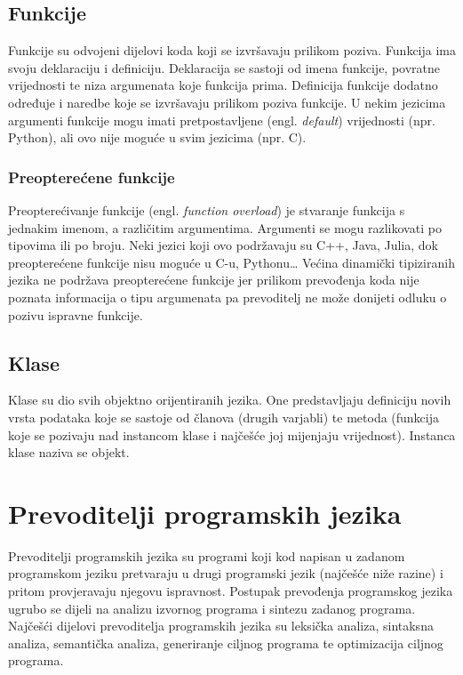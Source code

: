 \documentclass[times, utf8, zavrsni]{fer}
\begin{document}
\section{Funkcije}
Funkcije su odvojeni dijelovi koda koji se izvršavaju prilikom poziva. Funkcija ima svoju deklaraciju i definiciju. Deklaracija se sastoji od imena funkcije, povratne vrijednosti 
te niza argumenata koje funkcija prima. Definicija funkcije dodatno određuje i naredbe koje se izvršavaju prilikom poziva funkcije. U nekim jezicima argumenti funkcije mogu imati 
pretpostavljene (engl. \textit{default}) vrijednosti (npr. Python), ali ovo nije moguće u svim jezicima (npr. C).

\subsection{Preopterećene funkcije}
Preopterećivanje funkcije (engl. \textit{function overload}) je stvaranje funkcija s jednakim imenom, a različitim argumentima. Argumenti se mogu razlikovati po tipovima
ili po broju. Neki jezici koji ovo podržavaju su C++, Java, Julia, dok preopterećene funkcije nisu moguće u C-u, Pythonu\dots \cite{Kahanwal2014ComparativeSO} Većina dinamički tipiziranih jezika ne podržava
preopterećene funkcije jer prilikom prevođenja koda nije poznata informacija o tipu argumenata pa prevoditelj ne može donijeti odluku o pozivu ispravne funkcije.

\section{Klase}
Klase su dio svih objektno orijentiranih jezika. One predstavljaju definiciju novih vrsta podataka koje se sastoje od članova (drugih varjabli) te metoda (funkcija koje se pozivaju
nad instancom klase i najčešće joj mijenjaju vrijednost). Instanca klase naziva se objekt.

\chapter{Prevoditelji programskih jezika}
Prevoditelji programskih jezika su programi koji kod napisan u zadanom programskom jeziku pretvaraju u drugi programski jezik (najčešće niže razine) i pritom provjeravaju njegovu ispravnost.
Postupak prevođenja programskog jezika ugrubo se dijeli na analizu izvornog programa i sintezu zadanog programa. Najčešći dijelovi prevoditelja programskih jezika su leksička analiza,
sintaksna analiza, semantička analiza, generiranje ciljnog programa te optimizacija ciljnog programa.
\end{document}
